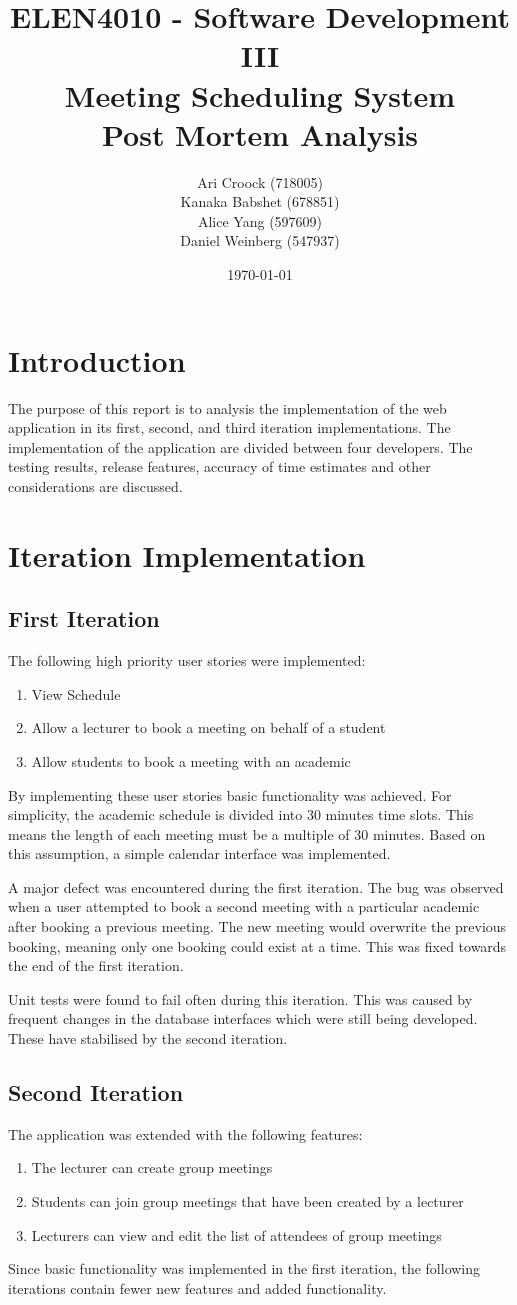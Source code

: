 \documentclass[11pt, a4paper]{article}
\title{ELEN4010 - Software Development III\\Meeting Scheduling System\\Post Mortem Analysis}
\author{Ari Croock (718005)\\Kanaka Babshet (678851)\\Alice Yang (597609)\\Daniel Weinberg (547937)}
\date{\today}
\begin{document}
	\maketitle
	\section{Introduction}
	The purpose of this report is to analysis the implementation of the web application in its first, second, and third iteration implementations. The implementation of the application are divided between four developers. The testing results, release features, accuracy of time estimates and other considerations are discussed.
	\section{Iteration Implementation}
	\subsection{First Iteration}
	The following high priority user stories were implemented:
	\begin{enumerate}
		\item View Schedule
		\item Allow a lecturer to book a meeting on behalf of a student
		\item Allow students to book a meeting with an academic
	\end{enumerate}
	By implementing these user stories basic functionality was achieved. For simplicity, the academic schedule is divided into 30 minutes time slots. This means the length of each meeting must be a multiple of 30 minutes. Based on this assumption, a simple calendar interface was implemented.
	
	A major defect was encountered during the first iteration. The bug was observed when a user attempted to book a second meeting with a particular academic after booking a previous meeting. The new meeting would overwrite the previous booking, meaning only one booking could exist at a time. This was fixed towards the end of the first iteration.
	
	Unit tests were found to fail often during this iteration. This was caused by frequent changes in the database interfaces which were still being developed. These have stabilised by the second iteration.
	\subsection{Second Iteration}
	The application was extended with the following features:
	\begin{enumerate}
		\item The lecturer can create group meetings
		\item Students can join group meetings that have been created by a lecturer
		\item Lecturers can view and edit the list of attendees of group meetings
	\end{enumerate}
	Since basic functionality was implemented in the first iteration, the following iterations contain fewer new features and added functionality.
	
\end{document}
